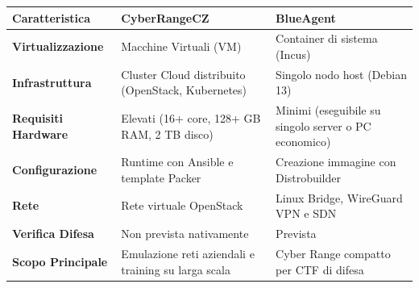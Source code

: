 \begin{longtable}[]{@{}
  >{\raggedright\arraybackslash}p{}
  >{\raggedright\arraybackslash}p{}
  >{\raggedright\arraybackslash}p{}@{}}
\toprule\noalign{}
\begin{minipage}[b]{\linewidth}\raggedright
Caratteristica
\end{minipage} & \begin{minipage}[b]{\linewidth}\raggedright
CyberRangeCZ
\end{minipage} & \begin{minipage}[b]{\linewidth}\raggedright
BlueAgent
\end{minipage} \\
\midrule\noalign{}
\endhead
\bottomrule\noalign{}
\endlastfoot
\textbf{Virtualizzazione} & Macchine Virtuali (VM) & Container di
sistema (Incus) \\
\textbf{Infrastruttura} & Cluster Cloud distribuito (OpenStack,
Kubernetes) & Singolo nodo host (Debian 13) \\
\textbf{Requisiti Hardware} & Elevati (16+ core, 128+ GB RAM, 2 TB
disco) & Minimi (eseguibile su singolo server o PC economico) \\
\textbf{Configurazione} & Runtime con Ansible e template Packer &
Creazione immagine con Distrobuilder \\
\textbf{Rete} & Rete virtuale OpenStack & Linux Bridge, WireGuard VPN e
SDN \\
\textbf{Verifica Difesa} & Non prevista nativamente & Prevista \\
\textbf{Scopo Principale} & Emulazione reti aziendali e training su
larga scala & Cyber Range compatto per CTF di difesa \\
\end{longtable}
